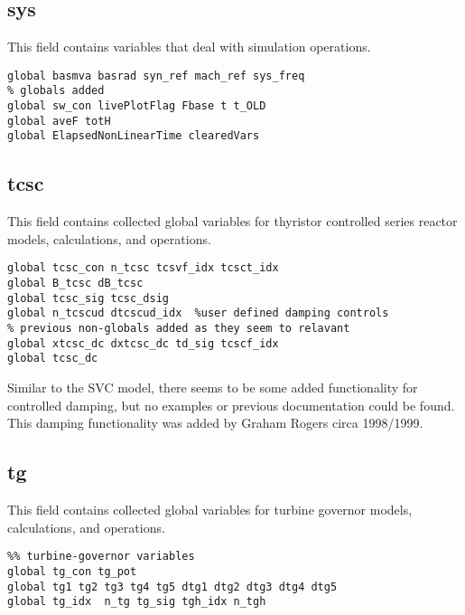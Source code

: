 \subsection{sys}
This field contains variables that deal with simulation operations.
\begin{verbatim}
global basmva basrad syn_ref mach_ref sys_freq
% globals added
global sw_con livePlotFlag Fbase t t_OLD
global aveF totH
global ElapsedNonLinearTime clearedVars
\end{verbatim}

\subsection{tcsc}
This field contains collected global variables for thyristor controlled series reactor models, calculations, and operations.
\begin{verbatim}
global tcsc_con n_tcsc tcsvf_idx tcsct_idx
global B_tcsc dB_tcsc
global tcsc_sig tcsc_dsig
global n_tcscud dtcscud_idx  %user defined damping controls
% previous non-globals added as they seem to relavant
global xtcsc_dc dxtcsc_dc td_sig tcscf_idx 
global tcsc_dc
\end{verbatim}

Similar to the SVC model, there seems to be some added functionality for controlled damping, but no examples or previous documentation could be found.
This damping functionality was added by Graham Rogers circa 1998/1999.

\pagebreak
\subsection{tg}
This field contains collected global variables for turbine governor models, calculations, and operations.
\begin{verbatim}
%% turbine-governor variables
global tg_con tg_pot
global tg1 tg2 tg3 tg4 tg5 dtg1 dtg2 dtg3 dtg4 dtg5
global tg_idx  n_tg tg_sig tgh_idx n_tgh
\end{verbatim}

